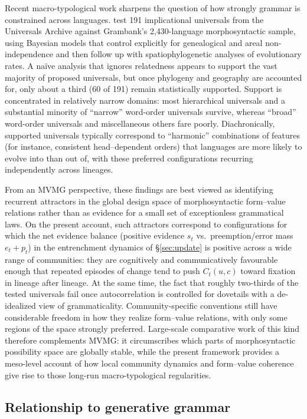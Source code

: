 \documentclass[12pt,letterpaper]{article}
\begin{document}
Recent macro-typological work sharpens the question of how strongly grammar is constrained across languages. \textcite{verkerk2025} test 191 implicational universals from the Universals Archive against Grambank's 2{,}430-language morphosyntactic sample, using Bayesian models that control explicitly for genealogical and areal non-independence and then follow up with spatiophylogenetic analyses of evolutionary rates. A naïve analysis that ignores relatedness appears to support the vast majority of proposed universals, but once phylogeny and geography are accounted for, only about a third (60 of 191) remain statistically supported. Support is concentrated in relatively narrow domains: most hierarchical universals and a substantial minority of \enquote{narrow} word-order universals survive, whereas \enquote{broad} word-order universals and miscellaneous others fare poorly. Diachronically, supported universals typically correspond to \enquote{harmonic} combinations of features (for instance, consistent head--dependent orders) that languages are more likely to evolve into than out of, with these preferred configurations recurring independently across lineages.

From an MVMG perspective, these findings are best viewed as identifying recurrent attractors in the global design space of morphosyntactic form--value relations rather than as evidence for a small set of exceptionless grammatical laws. On the present account, such attractors correspond to configurations for which the net evidence balance (positive evidence $s_t$ vs.\ preemption/error mass $e_t+p_t$) in the entrenchment dynamics of \S\ref{sec:update} is positive across a wide range of communities: they are cognitively and communicatively favourable enough that repeated episodes of change tend to push $C_t(u,c)$ toward fixation in lineage after lineage. At the same time, the fact that roughly two-thirds of the tested universals fail once autocorrelation is controlled for dovetails with a de-idealized view of grammaticality. Community-specific conventions still have considerable freedom in how they realize form--value relations, with only some regions of the space strongly preferred. Large-scale comparative work of this kind therefore complements MVMG: it circumscribes which parts of morphosyntactic possibility space are globally stable, while the present framework provides a meso-level account of how local community dynamics and form--value coherence give rise to those long-run macro-typological regularities.

\subsection{Relationship to generative grammar}
\end{document}

